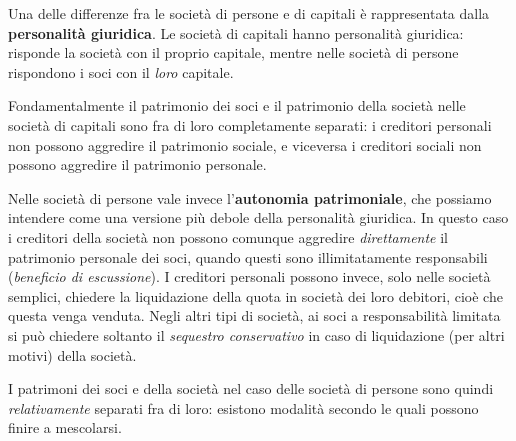 \documentclass[a4paper,11pt]{article}
\begin{document}
Una delle differenze fra le società di persone e di capitali è rappresentata dalla \textbf{personalità giuridica}.
Le società di capitali hanno personalità giuridica: risponde la società con il proprio capitale, mentre nelle società di persone rispondono i soci con il \textit{loro} capitale.

Fondamentalmente il patrimonio dei soci e il patrimonio della società nelle società di capitali sono fra di loro completamente separati: i creditori personali non possono aggredire il patrimonio sociale, e viceversa i creditori sociali non possono aggredire il patrimonio personale.

Nelle società di persone vale invece l'\textbf{autonomia patrimoniale}, che possiamo intendere come una versione più debole della personalità giuridica.
In questo caso i creditori della società non possono comunque aggredire \textit{direttamente} il patrimonio personale dei soci, quando questi sono illimitatamente responsabili (\textit{beneficio di escussione}).
I creditori personali possono invece, solo nelle società semplici, chiedere la liquidazione della quota in società dei loro debitori, cioè che questa venga venduta.
Negli altri tipi di società, ai soci a responsabilità limitata si può chiedere soltanto il \textit{sequestro conservativo} in caso di liquidazione (per altri motivi) della società.

I patrimoni dei soci e della società nel caso delle società di persone sono quindi \textit{relativamente} separati fra di loro: esistono modalità secondo le quali possono finire a mescolarsi.
\end{document}

